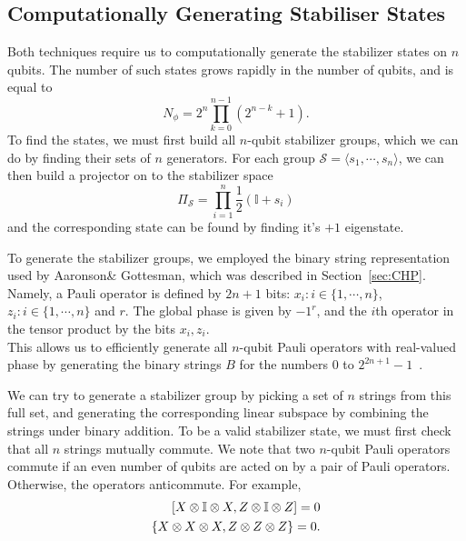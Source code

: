 \documentclass{standalone}
\begin{document}
\subsection{Computationally Generating Stabiliser States}
Both techniques require us to computationally generate the stabilizer states on $n$ qubits. The number of such states grows rapidly in the number of qubits, and is equal to~\cite{Aaronson2004a}
\begin{equation}\label{eq:nstabs}
    N_{\phi}=2^{n}\prod_{k=0}^{n-1}\left(2^{n-k}+1\right).
\end{equation}
To find the states, we must first build all $n$-qubit stabilizer groups, which we can do by finding their sets of $n$ generators. For each group $\mathcal{S}=\langle s_{1},\cdots,s_{n}\rangle$, we can then build a projector on to the stabilizer space~\cite{Gottesman1997}
\begin{equation}\label{eq:stabproj}
    \Pi_{\mathcal{S}} = \prod_{i=1}^{n} \frac{1}{2}\left(\mathbb{I}+s_{i}\right)
\end{equation}
and the corresponding state can be found by finding it's $+1$ eigenstate.
\par
To generate the stabilizer groups, we employed the binary string representation used by Aaronson\& Gottesman, which was described in Section~\ref{sec:CHP}. Namely, a Pauli operator is defined by $2n+1$ bits: $x_{i}:i\in\{1,\cdots,n\}$, $z_{i}:i\in\{1,\cdots,n\}$ and $r$. The global phase is given by $-1^{r}$, and the $i$th operator in the tensor product by the bits $x_{i},z_{i}$. \\
This allows us to efficiently generate all $n$-qubit Pauli operators with real-valued phase by generating the binary strings $B$ for the numbers $0$ to $2^{2n+1}-1$~\cite{Aaronson2004a}.\\
\par
We can try to generate a stabilizer group by picking a set of $n$ strings from this full set, and generating the corresponding linear subspace by combining the strings under binary addition. To be a valid stabilizer state, we must first check that all $n$ strings mutually commute. We note that two $n$-qubit Pauli operators commute if an even number of qubits are acted on by a pair of Pauli operators. Otherwise, the operators anticommute. For example, 
\begin{align*}
\comm{X\otimes\mathbb{I}\otimes X}{Z\otimes\mathbb{I}\otimes Z}= 0\\
\acomm{X\otimes X\otimes X}{Z\otimes Z\otimes Z} = 0. \\
\end{align*}
\end{document}
